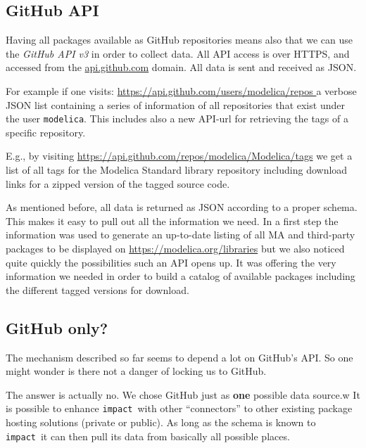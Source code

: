 \documentclass[11pt,a4paper,twocolumn]{article}
\newcommand{\impact}{\texttt{impact}} %
\newcommand{\code}[1]{\texttt{#1}} %
\begin{document}

\subsection{GitHub API}
\label{sec:gh-api}
Having all packages available as GitHub repositories means also that we can use
the \emph{GitHub API v3}\cite{gh-api} in order to collect data.
All API access is over HTTPS, and accessed from the \url{api.github.com} domain.
All data is sent and received as JSON\cite{json}.

For example if one visits:
\url{https://api.github.com/users/modelica/repos }
a verbose JSON list containing a series of information of all repositories
that exist under the user \code{modelica}.
This includes also a new API-url for retrieving the tags of a specific
repository.

E.g., by visiting \url{https://api.github.com/repos/modelica/Modelica/tags}
we get a list of all tags for the Modelica Standard library repository including
download links for a zipped version of the tagged source code.

As mentioned before, all data is returned as JSON according to a proper schema.
This makes it easy to pull out all the information we need.
In a first step the information was used to generate an up-to-date listing of
all MA and third-party packages to be displayed on
\url{https://modelica.org/libraries} but we also noticed quite quickly the
possibilities such an API opens up.
It was offering the very information we needed in order to build a catalog of
available packages including the different tagged versions for download.



\subsection{GitHub only?}
\label{sec:gh-only}
The mechanism described so far seems to depend a lot on GitHub's API.
So one might wonder is there not a danger of locking us to GitHub.

The answer is actually no. We chose GitHub just as \textbf{one} possible
data source.w
It is possible to enhance \impact\ with other ``connectors'' to other existing
package hosting solutions (private or public).
As long as the schema is known to \impact\ it can then  pull its data
from basically all possible places.
\end{document}
